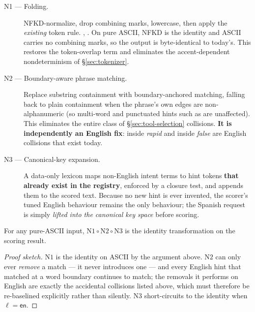 \begin{description}
  \item[N1 --- Folding.] NFKD-normalize, drop combining marks, lowercase, then
  apply the \emph{existing} token rule.  \textrightarrow{}
  ,  \textrightarrow{} . On pure
  ASCII, NFKD is the identity and ASCII carries no combining marks, so the output
  is byte-identical to today's. This restores the token-overlap term and
  eliminates the accent-dependent nondeterminism of \S\ref{sec:tokenizer}.

  \item[N2 --- Boundary-aware phrase matching.] Replace substring containment
  with boundary-anchored matching, falling back to plain containment when the
  phrase's own edges are non-alphanumeric (so multi-word and punctuated hints
  such as  are unaffected). This eliminates the entire class of
  \S\ref{sec:tool-selection} collisions. \textbf{It is independently an English
  fix}:  inside \emph{rapid} and  inside \emph{false} are
  English collisions that exist today.

  \item[N3 --- Canonical-key expansion.] A data-only lexicon maps non-English
  intent terms to hint tokens \textbf{that already exist in the registry},
  enforced by a closure test, and appends them to the scored text. Because no new
  hint is ever invented, the scorer's tuned English behaviour remains the only
  behaviour; the Spanish request is simply \emph{lifted into the canonical key
  space} before scoring.
\end{description}

\begin{lemma}
\label{lem:identity}
For any pure-ASCII input, $\mathrm{N1} \circ \mathrm{N2} \circ \mathrm{N3}$ is
the identity transformation on the scoring result.
\end{lemma}

\begin{proof}[Proof sketch]
$\mathrm{N1}$ is the identity on ASCII by the argument above. $\mathrm{N2}$ can
only ever \emph{remove} a match --- it never introduces one --- and every English
hint that matched at a word boundary continues to match; the removals it performs
on English are exactly the accidental collisions listed above, which must
therefore be re-baselined explicitly rather than silently. $\mathrm{N3}$
short-circuits to the identity when $\ell = \textsf{en}$.
\end{proof}

